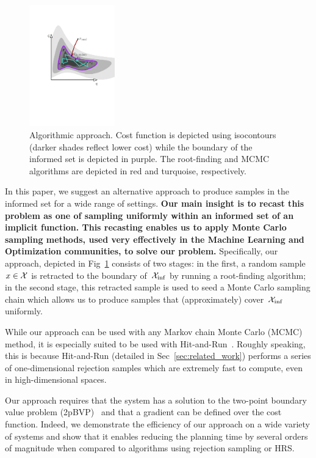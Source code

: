 \documentclass[letterpaper, 10 pt, conference]{ieeeconf}  %
\begin{document}
\begin{figure}[tb]
  \centering
  	\includegraphics[trim={4.5cm 0 4cm 2cm},clip,height = 5.25cm ]{fig/alg.pdf}
  \caption{
    \captionstyle
  	Algorithmic approach.
  	Cost function is depicted using isocontours (darker shades reflect lower cost) while the boundary of the informed set is depicted in purple. 
  	The root-finding and MCMC algorithms are depicted in red and turquoise, respectively.
  	}
   	\label{fig:alg}
\end{figure}


In this paper, we suggest an alternative approach to produce samples in the informed set \Cinf for a wide range of settings.
\textbf{
Our main insight is to recast this problem as one of sampling uniformly within an informed set of an implicit function.
This recasting enables us to apply Monte Carlo sampling methods, used very effectively in the Machine Learning and Optimization communities, to solve our problem.
}
Specifically, our approach, depicted in Fig~\ref{fig:alg} consists of two stages:
in the first, a random sample $x \in \mathcal{X}$ is retracted to the boundary of~$\mathcal{X}_{\rm {inf}}$ by running a root-finding algorithm;
in the second stage, this retracted sample  is used to seed a Monte Carlo sampling chain which allows us to  produce samples that (approximately) cover~$\mathcal{X}_{\rm {inf}}$  uniformly.

While our approach can be used with any Markov chain Monte Carlo (MCMC) method, it is especially suited to be used with Hit-and-Run~\cite{S84,KSZ11}.
Roughly speaking, this is because Hit-and-Run (detailed in Sec~\ref{sec:related_work})
performs a series of one-dimensional rejection samples which are extremely fast to compute, even in high-dimensional spaces. 

Our approach requires that the system has a solution to the two-point boundary value problem (2pBVP)~\cite{L06, H02} and that a gradient can be defined over the cost function.
Indeed, we demonstrate the efficiency of our approach on a wide variety of systems and show that it enables reducing the planning time by several orders of magnitude when compared to algorithms using rejection sampling or HRS.
\end{document}
